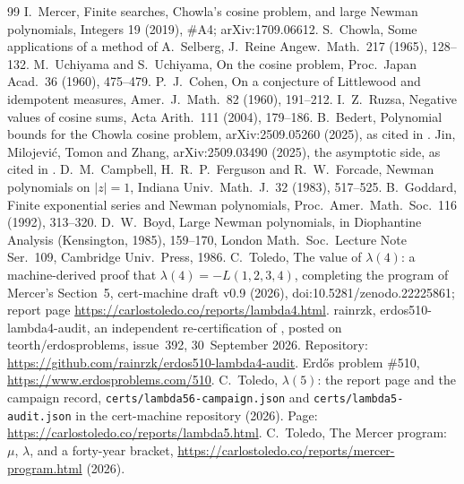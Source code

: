 \documentclass[11pt]{article}
\begin{document}
\begin{thebibliography}{99}
 I.~Mercer, Finite searches, Chowla's cosine problem, and large Newman polynomials, Integers 19 (2019), \#A4; arXiv:1709.06612.
 S.~Chowla, Some applications of a method of A.~Selberg, J.~Reine Angew.\ Math.\ 217 (1965), 128--132.
 M.~Uchiyama and S.~Uchiyama, On the cosine problem, Proc.\ Japan Acad.\ 36 (1960), 475--479.
 P.~J.~Cohen, On a conjecture of Littlewood and idempotent measures, Amer.\ J.\ Math.\ 82 (1960), 191--212.
 I.~Z.~Ruzsa, Negative values of cosine sums, Acta Arith.\ 111 (2004), 179--186.
 B.~Bedert, Polynomial bounds for the Chowla cosine problem, arXiv:2509.05260 (2025), as cited in \cite{L4}.
 Jin, Milojevi\'c, Tomon and Zhang, arXiv:2509.03490 (2025), the asymptotic side, as cited in \cite{L4}.
 D.~M.~Campbell, H.~R.~P.~Ferguson and R.~W.~Forcade, Newman polynomials on $|z|=1$, Indiana Univ.\ Math.\ J.\ 32 (1983), 517--525.
 B.~Goddard, Finite exponential series and Newman polynomials, Proc.\ Amer.\ Math.\ Soc.\ 116 (1992), 313--320.
 D.~W.~Boyd, Large Newman polynomials, in Diophantine Analysis (Kensington, 1985), 159--170, London Math.\ Soc.\ Lecture Note Ser.\ 109, Cambridge Univ.\ Press, 1986.
 C.~Toledo, The value of $\lambda(4)$: a machine-derived proof that $\lambda(4)=-L(1,2,3,4)$, completing the program of Mercer's Section~5, cert-machine draft v0.9 (2026), doi:10.5281/zenodo.22225861; report page \url{https://carlostoledo.co/reports/lambda4.html}.
 rainrzk, erdos510-lambda4-audit, an independent re-certification of \cite{L4}, posted on teorth/erdosproblems, issue~392, 30~September 2026. Repository: \url{https://github.com/rainrzk/erdos510-lambda4-audit}.
 Erd\H{o}s problem \#510, \url{https://www.erdosproblems.com/510}.
 C.~Toledo, $\lambda(5)$: the report page and the campaign record, \texttt{certs/lambda56-campaign.json} and \texttt{certs/lambda5-audit.json} in the cert-machine repository (2026). Page: \url{https://carlostoledo.co/reports/lambda5.html}.
 C.~Toledo, The Mercer program: $\mu$, $\lambda$, and a forty-year bracket, \url{https://carlostoledo.co/reports/mercer-program.html} (2026).
\end{thebibliography}
\end{document}
